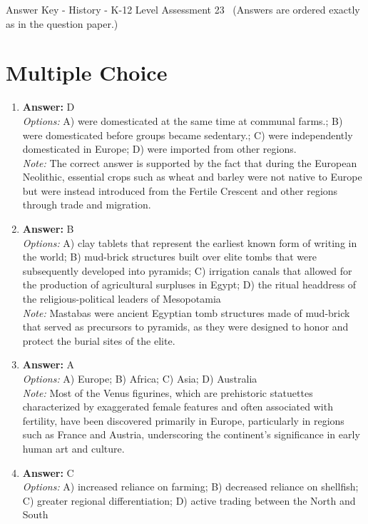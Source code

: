 \documentclass[12pt]{article}
\begin{document}
\begin{center}
Answer Key - History - K-12 Level Assessment 23 \
\small (Answers are ordered exactly as in the question paper.)
\end{center}

\section*{Multiple Choice}
\begin{enumerate}[label=\arabic*.]
\item \textbf{Answer:} D
\\ \textit{Options:} A) were domesticated at the same time at communal farms.; B) were domesticated before groups became sedentary.; C) were independently domesticated in Europe; D) were imported from other regions.
\\ \textit{Note:} The correct answer is supported by the fact that during the European Neolithic, essential crops such as wheat and barley were not native to Europe but were instead introduced from the Fertile Crescent and other regions through trade and migration.
\item \textbf{Answer:} B
\\ \textit{Options:} A) clay tablets that represent the earliest known form of writing in the world; B) mud-brick structures built over elite tombs that were subsequently developed into pyramids; C) irrigation canals that allowed for the production of agricultural surpluses in Egypt; D) the ritual headdress of the religious-political leaders of Mesopotamia
\\ \textit{Note:} Mastabas were ancient Egyptian tomb structures made of mud-brick that served as precursors to pyramids, as they were designed to honor and protect the burial sites of the elite.
\item \textbf{Answer:} A
\\ \textit{Options:} A) Europe; B) Africa; C) Asia; D) Australia
\\ \textit{Note:} Most of the Venus figurines, which are prehistoric statuettes characterized by exaggerated female features and often associated with fertility, have been discovered primarily in Europe, particularly in regions such as France and Austria, underscoring the continent's significance in early human art and culture.
\item \textbf{Answer:} C
\\ \textit{Options:} A) increased reliance on farming; B) decreased reliance on shellfish; C) greater regional differentiation; D) active trading between the North and South

\end{enumerate}
\end{document}
